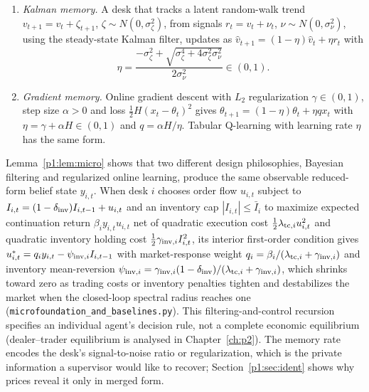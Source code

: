 \begin{lemma}\label{p1:lem:micro}
\begin{enumerate}[label=(\roman*)]
\item \emph{Kalman memory.} A desk that tracks a latent random-walk trend $v_{t+1}=v_t+\zeta_{t+1}$, $\zeta\sim N(0,\sigma_\zeta^2)$, from signals $r_t=v_t+\nu_t$, $\nu\sim N(0,\sigma_\nu^2)$, using the steady-state Kalman filter, updates as $\hat v_{t+1}=(1-\eta)\hat v_t+\eta r_t$ with
\begin{equation}\label{p1:eq:kgain}
\eta=\frac{-\sigma_\zeta^2+\sqrt{\sigma_\zeta^4+4\sigma_\zeta^2\sigma_\nu^2}}{2\sigma_\nu^2}\in(0,1).
\end{equation}
\item \emph{Gradient memory.} Online gradient descent with $L_2$ regularization $\gamma\in(0,1)$, step size $\alpha>0$ and loss $\tfrac12H(x_t-\theta_t)^2$ gives $\theta_{t+1}=(1-\eta)\theta_t+\eta q x_t$ with $\eta=\gamma+\alpha H\in(0,1)$ and $q=\alpha H/\eta$. Tabular Q-learning with learning rate $\eta$ has the same form.
\end{enumerate}
\end{lemma}

\begin{remark}
Lemma~\ref{p1:lem:micro} shows that two different design philosophies, Bayesian filtering and regularized online learning, produce the same observable reduced-form belief state $y_{i,t}$. When desk $i$ chooses order flow $u_{i,t}$ subject to $I_{i,t}=(1-\delta_{\rm inv})I_{i,t-1}+u_{i,t}$ and an inventory cap $|I_{i,t}|\le\bar I_i$ to maximize expected continuation return $\beta_i y_{i,t}u_{i,t}$ net of quadratic execution cost $\tfrac12\lambda_{{\rm tc},i}u_{i,t}^2$ and quadratic inventory holding cost $\tfrac12\gamma_{{\rm inv},i}I_{i,t}^2$, its interior first-order condition gives $u_{i,t}^*=q_iy_{i,t}-\psi_{{\rm inv},i}I_{i,t-1}$ with market-response weight $q_i=\beta_i/(\lambda_{{\rm tc},i}+\gamma_{{\rm inv},i})$ and inventory mean-reversion $\psi_{{\rm inv},i}=\gamma_{{\rm inv},i}(1-\delta_{\rm inv})/(\lambda_{{\rm tc},i}+\gamma_{{\rm inv},i})$, which shrinks toward zero as trading costs or inventory penalties tighten and destabilizes the market when the closed-loop spectral radius reaches one (\texttt{microfoundation\_and\_baselines.py}). This filtering-and-control recursion specifies an individual agent's decision rule, not a complete economic equilibrium (dealer--trader equilibrium is analysed in Chapter~\ref{ch:p2}). The memory rate encodes the desk's signal-to-noise ratio or regularization, which is the private information a supervisor would like to recover; Section~\ref{p1:sec:ident} shows why prices reveal it only in merged form.
\end{remark}


